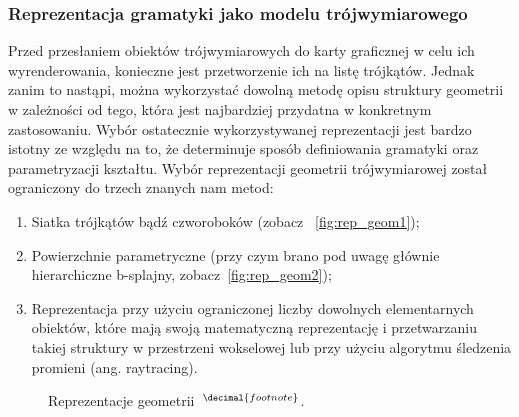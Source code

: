 \subsubsection{Reprezentacja gramatyki jako modelu trójwymiarowego}
Przed przesłaniem obiektów trójwymiarowych do karty graficznej w celu ich
wyrenderowania, konieczne jest przetworzenie ich na listę trójkątów. Jednak
zanim to nastąpi, można wykorzystać dowolną metodę opisu struktury geometrii w
zależności od tego, która jest najbardziej przydatna w konkretnym zastosowaniu.
Wybór ostatecznie wykorzystywanej reprezentacji jest bardzo istotny ze względu na to, że determinuje sposób definiowania gramatyki oraz parametryzacji kształtu.
Wybór reprezentacji geometrii trójwymiarowej został ograniczony do trzech
znanych nam metod:
\begin{enumerate}
  \item Siatka trójkątów bądź czworoboków (zobacz ~\ref{fig:rep_geom1});
  \item Powierzchnie parametryczne (przy czym brano pod uwagę głównie
  hierarchiczne b-splajny, zobacz~\ref{fig:rep_geom2});
  \item Reprezentacja przy użyciu ograniczonej liczby dowolnych elementarnych
  obiektów, które mają swoją matematyczną reprezentację i przetwarzaniu takiej
  struktury w przestrzeni wokselowej lub przy użyciu algorytmu śledzenia
  promieni (ang. raytracing).
\end{enumerate}

{
\begin{figure}[h]
  \centering
  \quad
  \quad
  \label{fig:rep_geom}
  \caption{Reprezentacje geometrii~$^{\decimal{footnote}}$.}
\end{figure}
}

